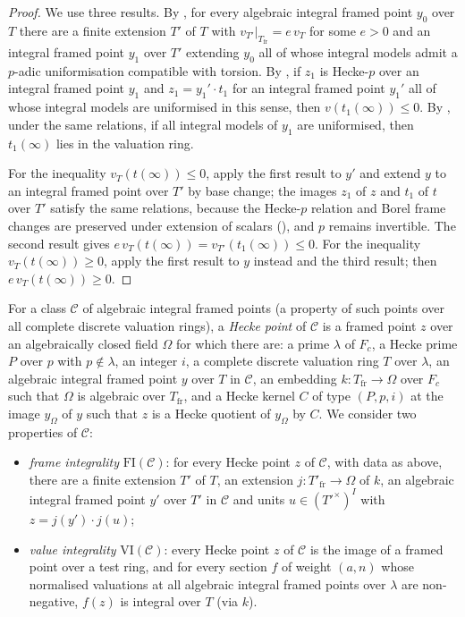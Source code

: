 \begin{proof}
We use three results. By , for every algebraic integral framed point $y_0$
over $T$ there are a finite extension $T'$ of $T$ with $v_{T'}|_{T_{\mathrm{fr}}}=e\,v_T$ for some $e>0$ and an integral framed point $y_1$ over $T'$
extending $y_0$ all of whose integral models admit a $p$-adic uniformisation compatible with torsion. By
, if $z_1$ is Hecke-$p$ over an integral framed point $y_1$ and $z_1=y_1'\cdot t_1$ for an integral
framed point $y_1'$ all of whose integral models are uniformised in this sense, then $v(t_1(\infty))\le0$. By
, under the same relations, if all integral models of $y_1$ are uniformised, then $t_1(\infty)$ lies in the
valuation ring.

For the inequality $v_T(t(\infty))\le0$, apply the first result to $y'$ and extend $y$ to an integral framed point over $T'$ by base change; the
images $z_1$ of $z$ and $t_1$ of $t$ over $T'$ satisfy the same relations, because the Hecke-$p$ relation and Borel frame changes are preserved under
extension of scalars (), and $p$ remains invertible. The second result gives
$e\,v_T(t(\infty))=v_{T'}(t_1(\infty))\le0$. For the inequality $v_T(t(\infty))\ge0$, apply the first result to $y$ instead and the third result; then
$e\,v_T(t(\infty))\ge0$.
\end{proof}

For a class $\mathcal C$ of algebraic integral framed points (a property of such points over all complete discrete valuation rings), a \emph{Hecke point}
of $\mathcal C$ is a framed point $z$ over an algebraically closed field $\Omega$ for which there are: a prime $\lambda$ of $F_c$, a Hecke prime $P$ over
$p$ with $p\notin\lambda$, an integer $i$, a complete discrete valuation ring $T$ over $\lambda$, an algebraic integral framed point $y$ over $T$ in
$\mathcal C$, an embedding $k:T_{\mathrm{fr}}\to\Omega$ over $F_c$ such that $\Omega$ is algebraic over $T_{\mathrm{fr}}$, and a Hecke kernel $C$ of type
$(P,p,i)$ at the image $y_\Omega$ of $y$ such that $z$ is a Hecke quotient of $y_\Omega$ by $C$. We consider two properties of $\mathcal C$:
\begin{itemize}
\item \emph{frame integrality} $\mathrm{FI}(\mathcal C)$: for every Hecke point $z$ of $\mathcal C$, with data as above, there are a finite extension $T'$
of $T$, an extension $j:T'_{\mathrm{fr}}\to\Omega$ of $k$, an algebraic integral framed point $y'$ over $T'$ in $\mathcal C$ and units $u\in(T'^\times)^I$
with $z=j(y')\cdot j(u)$;
\item \emph{value integrality} $\mathrm{VI}(\mathcal C)$: every Hecke point $z$ of $\mathcal C$ is the image of a framed point over a test ring, and for every
section $f$ of weight $(a,n)$ whose normalised valuations at all algebraic integral framed points over $\lambda$ are non-negative, $f(z)$ is integral over
$T$ (via $k$).
\end{itemize}

